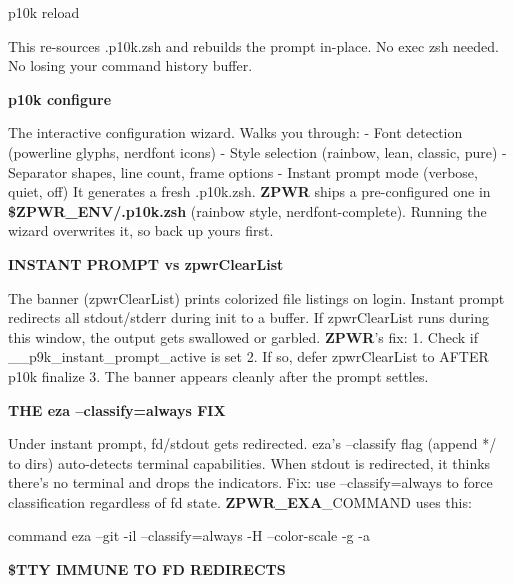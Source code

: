 \documentclass[11pt,a4paper,twoside]{book}
\begin{document}
\begin{codebox}
\color{neongreen}p10k reload\\
\end{codebox}

This re-sources .p10k.zsh and rebuilds the prompt in-place. No exec zsh needed. No losing your command history buffer.


\vspace{12pt}
{\bfseries\color{neonyellow} p10k configure}\vspace{4pt}

The interactive configuration wizard. Walks you through: - Font detection (powerline glyphs, nerdfont icons) - Style selection (rainbow, lean, classic, pure) - Separator shapes, line count, frame options - Instant prompt mode (verbose, quiet, off) It generates a fresh .p10k.zsh. \textbf{ZPWR} ships a pre-configured one in \textbf{\$ZPWR\_ENV/.p10k.zsh} (rainbow style, nerdfont-complete). Running the wizard overwrites it, so back up yours first.


\vspace{12pt}
{\bfseries\color{neonyellow} INSTANT \textbf{PROMPT} vs zpwrClearList}\vspace{4pt}

The banner (zpwrClearList) prints colorized file listings on login. Instant prompt redirects all stdout/stderr during init to a buffer. If zpwrClearList runs during this window, the output gets swallowed or garbled. \textbf{ZPWR}'s fix: 1. Check if \_\_p9k\_instant\_prompt\_active is set 2. If so, defer zpwrClearList to AFTER p10k finalize 3. The banner appears cleanly after the prompt settles.


\vspace{12pt}
{\bfseries\color{neonyellow} THE eza --classify=always FIX}\vspace{4pt}

Under instant prompt, fd/stdout gets redirected. eza's --classify flag (append */ to dirs) auto-detects terminal capabilities. When stdout is redirected, it thinks there's no terminal and drops the indicators. Fix: use --classify=always to force classification regardless of fd state. \textbf{ZPWR\_EXA}\_COMMAND uses this:

\begin{codebox}
\color{neongreen}command eza --git -il --classify=always -H --color-scale -g -a\\
\end{codebox}


\vspace{12pt}
{\bfseries\color{neonyellow} \$TTY IMMUNE TO FD REDIRECTS}\vspace{4pt}
\end{document}
